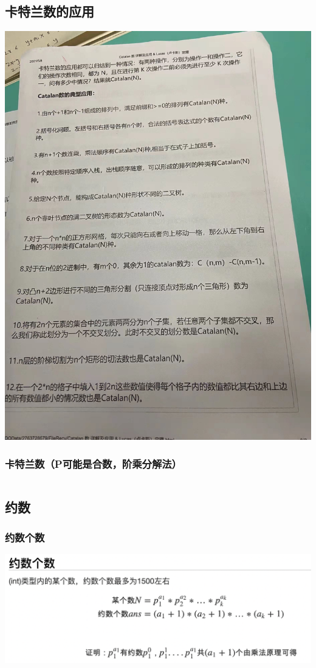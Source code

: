 \documentclass[a4paper,11pt]{article}
\begin{document}
\subsection{卡特兰数的应用}
\includegraphics[scale=0.6]{数论/卡特兰数应用.png}
\subsubsection{卡特兰数（P可能是合数，阶乘分解法）} %
\inputminted[breaklines]{c++}{数论/卡特兰数.cpp}
\subsection{约数} %
\subsubsection{约数个数} %
\includegraphics[scale=0.6]{数论/约数个数.png}
\inputminted[breaklines]{c++}{数论/约数个数.cpp}
\end{document}
